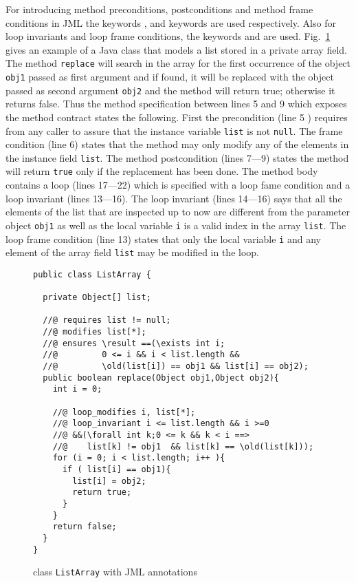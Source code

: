 For introducing method preconditions, postconditions and method frame conditions in JML the keywords ,
  and  keywords are used  respectively. Also for loop invariants and loop frame conditions,
 the keywords  and  are used.
Fig.~\ref{replaceSrc} gives an example of a Java class that models a list stored in a private array field. 
The method \texttt{replace} will search in the array for the first occurrence of the object \texttt{obj1} passed as first argument
 and if found, it will be replaced with the object passed as second argument \texttt{obj2} and the method will return true; otherwise it 
returns false. Thus the method  specification between lines 5 and 9 which exposes the method contract states the following.
First the precondition (line 5 ) requires from any caller to assure that the instance variable \texttt{list} is not \texttt{null}.
The frame condition (line  6) states that the method may only
modify any of the elements in the instance field \texttt{list}. The method postcondition (lines 7---9) states the method will return 
\texttt{true} only if  the replacement has been done.
The method body contains a loop (lines 17---22) which is specified with a loop fame condition and a loop invariant (lines 13---16).
  The loop invariant (lines 14---16) says that all the elements of the list that are inspected up to now are 
 different from the parameter object \texttt{obj1} as well as the local variable \texttt{i}  is a valid index in the array \texttt{list}.
 The loop frame condition (line 13)  states that only the local variable \texttt{i} and any element of the array field \texttt{list} may be modified in the loop.

\begin{figure}[ht!]
\begin{lstlisting}[frame=trbl] 
public class ListArray {
  
  private Object[] list;
  
  //@ requires list != null;
  //@ modifies list[*];
  //@ ensures \result ==(\exists int i; 
  //@         0 <= i && i < list.length && 
  //@         \old(list[i]) == obj1 && list[i] == obj2);
  public boolean replace(Object obj1,Object obj2){
    int i = 0;
    
    //@ loop_modifies i, list[*];
    //@ loop_invariant i <= list.length && i >=0 
    //@ &&(\forall int k;0 <= k && k < i ==> 
    //@    list[k] != obj1  && list[k] == \old(list[k]));
    for (i = 0; i < list.length; i++ ){
      if ( list[i] == obj1){
        list[i] = obj2;
        return true;	
      }
    }
    return false;
  }
}
\end{lstlisting}
\caption{\sc class \mbox{\rm \lstinline!ListArray!} with JML annotations} 
\label{replaceSrc}
\end{figure}

